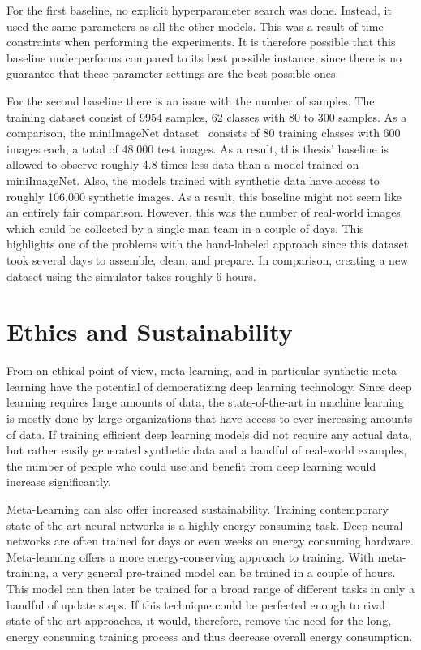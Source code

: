 For the first baseline, no explicit hyperparameter search was done. Instead, it used the same parameters as all the other models. This was a result of time constraints when performing the experiments. It is therefore possible that this baseline underperforms compared to its best possible instance, since there is no guarantee that these parameter settings are the best possible ones.

For the second baseline there is an issue with the number of samples. The training dataset consist of 9954 samples, 62 classes with 80 to 300 samples. As a comparison, the miniImageNet dataset~\cite{matching} consists of 80 training classes with 600 images each, a total of 48,000 test images. As a result, this thesis' baseline is allowed to observe roughly 4.8 times less data than a model trained on miniImageNet. Also, the models trained with synthetic data have access to roughly 106,000 synthetic images. As a result, this baseline might not seem like an entirely fair comparison. However, this was the number of real-world images which could be collected by a single-man team in a couple of days. This highlights one of the problems with the hand-labeled approach since this dataset took several days to assemble, clean, and prepare. In comparison, creating a new dataset using the simulator takes roughly 6 hours.

\section{Ethics and Sustainability}
From an ethical point of view, meta-learning, and in particular synthetic meta-learning have the potential of democratizing deep learning technology. Since deep learning requires large amounts of data, the state-of-the-art in machine learning is mostly done by large organizations that have access to ever-increasing amounts of data. If training efficient deep learning models did not require any actual data, but rather easily generated synthetic data and a handful of real-world examples, the number of people who could use and benefit from deep learning would increase significantly. 

Meta-Learning can also offer increased sustainability. Training contemporary state-of-the-art neural networks is a highly energy consuming task. Deep neural networks are often trained for days or even weeks on energy consuming hardware. Meta-learning offers a more energy-conserving approach to training. With meta-training, a very general pre-trained model can be trained in a couple of hours. This model can then later be trained for a broad range of different tasks in only a handful of update steps. If this technique could be perfected enough to rival state-of-the-art approaches, it would, therefore, remove the need for the long, energy consuming training process and thus decrease overall energy consumption.
